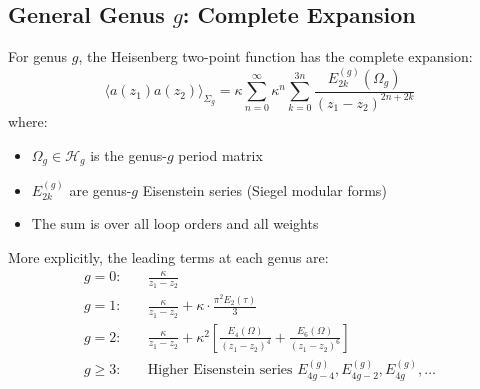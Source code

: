 \subsection{General Genus $g$: Complete Expansion}
\label{subsec:heisenberg-general-genus}

\begin{theorem}\label{thm:heisenberg-all-genus}
For genus $g$, the Heisenberg two-point function has the complete expansion:
\begin{equation}
\langle a(z_1) a(z_2) \rangle_{\Sigma_g} = \kappa \sum_{n=0}^{\infty} 
\kappa^n \sum_{k=0}^{3n} \frac{E_{2k}^{(g)}(\Omega_g)}{(z_1-z_2)^{2n+2k}}
\end{equation}
where:
\begin{itemize}
\item $\Omega_g \in \mathcal{H}_g$ is the genus-$g$ period matrix
\item $E_{2k}^{(g)}$ are genus-$g$ Eisenstein series (Siegel modular forms)
\item The sum is over all loop orders and all weights
\end{itemize}

More explicitly, the leading terms at each genus are:
\begin{align}
g=0: \quad & \frac{\kappa}{z_1-z_2} \\
g=1: \quad & \frac{\kappa}{z_1-z_2} + \kappa \cdot \frac{\pi^2 E_2(\tau)}{3} \\
g=2: \quad & \frac{\kappa}{z_1-z_2} + \kappa^2 \left[\frac{E_4(\Omega)}{(z_1-z_2)^4} 
+ \frac{E_6(\Omega)}{(z_1-z_2)^6}\right] \\
g \geq 3: \quad & \text{Higher Eisenstein series } E_{4g-4}^{(g)}, E_{4g-2}^{(g)}, 
E_{4g}^{(g)}, \ldots
\end{align}
\end{theorem}

